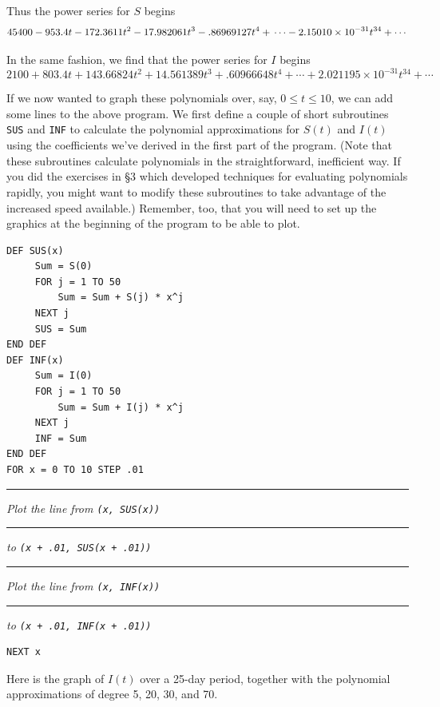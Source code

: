 {{{{\vspace{12pt}
\noindent
 Thus the power series for $S$ begins
\small
 \[
45400 - 953.4t - 172.3611t^2 - 17.982061t^3 - .86969127t^4 + \\ \cdots - 2.15010\times 10^{-31}t^{34} + \cdots
\]
\normalsize

In the same fashion, we find that the power series for $I$ begins
\small
\[
2100 +803.4t + 143.66824t^2 + 14.561389t^3 + .60966648t^4 + \cdots + 2.021195\times 10^{-31}t^{34} + \cdots
\]
\normalsize

If we now wanted to graph these  polynomials over, say, $0\le t\le 10$, we can add some lines to the above program.  We first define a couple of short subroutines {\tt SUS} and {\tt INF} to calculate the polynomial approximations for $S(t)$ and $I(t)$ using the coefficients we've derived in the first part of the program.  (Note that these subroutines calculate polynomials in the straightforward, inefficient way.  If you did the exercises in \S3 which developed techniques for evaluating polynomials rapidly, you might want to modify these subroutines to take advantage of the increased speed available.) Remember, too, that you will need to set up the graphics at the beginning of the program to be able to plot.

\noindent
\begin{verbatim}
DEF SUS(x)
     Sum = S(0)
     FOR j = 1 TO 50
         Sum = Sum + S(j) * x^j
     NEXT j
     SUS = Sum
END DEF
DEF INF(x)
     Sum = I(0)
     FOR j = 1 TO 50
         Sum = Sum + I(j) * x^j
     NEXT j
     INF = Sum
END DEF
FOR x = 0 TO 10 STEP .01
\end{verbatim}
\vspace{-10pt}
\rule{34pt}{0pt} {\sl Plot the line from 
                {\tt (x, SUS(x))}}\\[-1pt]
\rule{52pt}{0pt} {\sl to 
                {\tt (x + .01, SUS(x + .01))}}\\
\rule{34pt}{0pt} {\sl Plot the line from 
                {\tt (x, INF(x))}}\\[-1pt]
\rule{52pt}{0pt} {\sl to 
                {\tt (x + .01, INF(x + .01))}}\\
\vspace{-25pt}
\begin{verbatim}
NEXT x
\end{verbatim}

Here is the graph of $I(t)$ over a 25-day period, together with the polynomial approximations of degree 5, 20, 30, and 70.  

}}}}
